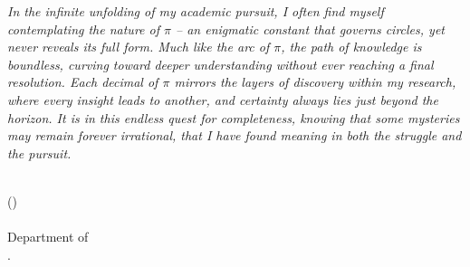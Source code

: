 \begin{titlepage}
    \par\textsl{In the infinite unfolding of my academic pursuit, I often find myself contemplating the nature of $\pi$ -- an enigmatic constant that governs circles, yet never reveals its full form. Much like the arc of $\pi$, the path of knowledge is boundless, curving toward deeper understanding without ever reaching a final resolution. Each decimal of $\pi$ mirrors the layers of discovery within my research, where every insight leads to another, and certainty always lies just beyond the horizon. It is in this endless quest for completeness, knowing that some mysteries may remain forever irrational, that I have found meaning in both the struggle and the pursuit.}
    
    \bigskip\medskip
    \bigskip\medskip
    \bigskip\medskip\bigskip\medskip
    \noindent\\
    \hfill (\authorname)
    \noindent\\
    \hfill {\submissiontime} \\
    \hfill Department of \department\\
    \hfill \university.
\end{titlepage}